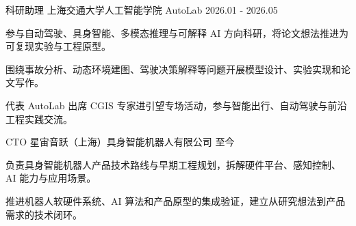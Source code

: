 
\begin{cventries}

  \cventry
    {科研助理}
    {上海交通大学人工智能学院 AutoLab}
    {}
    {2026.01 - 2026.05}
    {
      \begin{cvitems}
        \item {参与自动驾驶、具身智能、多模态推理与可解释 AI 方向科研，将论文想法推进为可复现实验与工程原型。}
        \item {围绕事故分析、动态环境建图、驾驶决策解释等问题开展模型设计、实验实现和论文写作。}
        \item {代表 AutoLab 出席 CGIS 专家进引望专场活动，参与智能出行、自动驾驶与前沿工程实践交流。}
      \end{cvitems}
    }

\end{cventries}


\begin{cventries}

  \cventry
    {CTO}
    {星宙音跃（上海）具身智能机器人有限公司}
    {}
    {至今}
    {
      \begin{cvitems}
        \item {负责具身智能机器人产品技术路线与早期工程规划，拆解硬件平台、感知控制、AI 能力与应用场景。}
        \item {推进机器人软硬件系统、AI 算法和产品原型的集成验证，建立从研究想法到产品需求的技术闭环。}
      \end{cvitems}
    }

\end{cventries}


